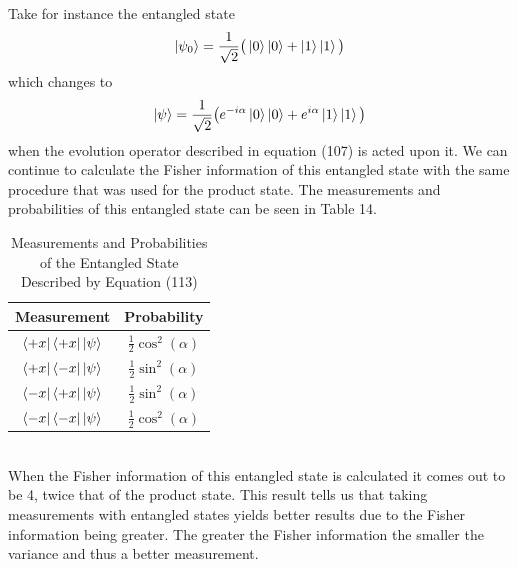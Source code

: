 \documentclass[twocolumn]{article}
\begin{document}
Take for instance the entangled state
\begin{equation}
\ket{\psi_0}=\frac{1}{\sqrt{2}}\big(\ket{0}\ket{0}+\ket{1}\ket{1}\big)
\end{equation}
which changes to 
\begin{equation}
\ket{\psi}=\frac{1}{\sqrt{2}}\big(e^{-i\alpha}\ket{0}\ket{0}+e^{i\alpha}\ket{1}\ket{1}\big)
\end{equation}
when the evolution operator described in equation (107) is acted upon it. We can continue to calculate the Fisher information of this entangled state with the same procedure that was used for the product state. The measurements and probabilities of this entangled state can be seen in Table 14.
\begin{table}[h!]
\begin{center}
\begin{tabular}{ |c|c| }
\hline Measurement & Probability \\
\hline $\bra{+x}\bra{+x}\ket{\psi}$ & $\frac{1}{2}\cos^2{(\alpha)}$ \\
\hline $\bra{+x}\bra{-x}\ket{\psi}$ & $\frac{1}{2}\sin^2{(\alpha)}$ \\
\hline $\bra{-x}\bra{+x}\ket{\psi}$ & $\frac{1}{2}\sin^2{(\alpha)}$ \\
\hline $\bra{-x}\bra{-x}\ket{\psi}$ & $\frac{1}{2}\cos^2{(\alpha)}$ \\
\hline
\end{tabular}
\caption{Measurements and Probabilities of the Entangled State Described by Equation (113)}
\end{center}
\end{table} \\
When the Fisher information of this entangled state is calculated it comes out to be 4, twice that of the product state. This result tells us that taking measurements with entangled states yields better results due to the Fisher information being greater. The greater the Fisher information the smaller the variance and thus a better measurement.
\end{document}
